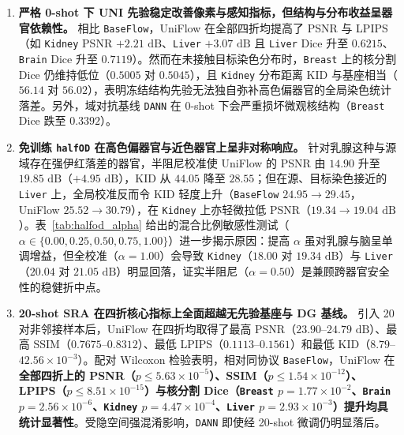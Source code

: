 \documentclass[journal]{IEEEtran}
\newcommand{\methodname}{UniFlow}
\begin{document}
\begin{enumerate}
    \item \textbf{严格 0-shot 下 UNI 先验稳定改善像素与感知指标，但结构与分布收益呈器官依赖性。} 相比 \texttt{BaseFlow}，\methodname{} 在全部四折均提高了 PSNR 与 LPIPS（如 \texttt{Kidney} PSNR $+2.21\text{ dB}$、\texttt{Liver} $+3.07\text{ dB}$ 且 \texttt{Liver} Dice 升至 $0.6215$、\texttt{Brain} Dice 升至 $0.7119$）。然而在未接触目标染色分布时，\texttt{Breast} 上的核分割 Dice 仍维持低位（$0.5005$ 对 $0.5045$），且 \texttt{Kidney} 分布距离 KID 与基座相当（$56.14$ 对 $56.02$），表明冻结结构先验无法独自弥补高色偏器官的全局染色统计落差。另外，域对抗基线 \texttt{DANN} 在 0-shot 下会严重损坏微观核结构（\texttt{Breast} Dice 跌至 $0.3392$）。
    \item \textbf{免训练 \texttt{halfOD} 在高色偏器官与近色器官上呈非对称响应。} 针对乳腺这种与源域存在强伊红落差的器官，半阻尼校准使 \methodname{} 的 PSNR 由 $14.90$ 升至 $19.85\text{ dB}$（$+4.95\text{ dB}$），KID 从 $44.05$ 降至 $28.55$；但在源、目标染色接近的 \texttt{Liver} 上，全局校准反而令 KID 轻度上升（\texttt{BaseFlow} $24.95 \to 29.45$，\methodname{} $25.52 \to 30.79$），在 \texttt{Kidney} 上亦轻微拉低 PSNR（$19.34 \to 19.04\text{ dB}$）。表~\ref{tab:halfod_alpha} 给出的混合比例敏感性测试（$\alpha \in \{0.00, 0.25, 0.50, 0.75, 1.00\}$）进一步揭示原因：提高 $\alpha$ 虽对乳腺与脑呈单调增益，但全校准（$\alpha=1.00$）会导致 \texttt{Kidney}（$18.00$ 对 $19.34\text{ dB}$）与 \texttt{Liver}（$20.04$ 对 $21.05\text{ dB}$）明显回落，证实半阻尼（$\alpha=0.50$）是兼顾跨器官安全性的稳健折中点。
    \item \textbf{20-shot SRA 在四折核心指标上全面超越无先验基座与 DG 基线。} 引入 20 对非邻接样本后，\methodname{} 在四折均取得了最高 PSNR（$23.90$--$24.79\text{ dB}$）、最高 SSIM（$0.7675$--$0.8312$）、最低 LPIPS（$0.1113$--$0.1561$）和最低 KID（$8.79$--$42.56\times 10^{-3}$）。配对 Wilcoxon 检验表明，相对同协议 \texttt{BaseFlow}，\methodname{} 在\textbf{全部四折上的 PSNR（$p \le 5.63\times 10^{-5}$）、SSIM（$p \le 1.54\times 10^{-12}$）、LPIPS（$p \le 8.51\times 10^{-15}$）与核分割 Dice（\texttt{Breast} $p=1.77\times 10^{-2}$、\texttt{Brain} $p=2.56\times 10^{-6}$、\texttt{Kidney} $p=4.47\times 10^{-4}$、\texttt{Liver} $p=2.93\times 10^{-3}$）提升均具统计显著性}。受隐空间强混淆影响，\texttt{DANN} 即使经 20-shot 微调仍明显落后。
\end{enumerate}
\end{document}
